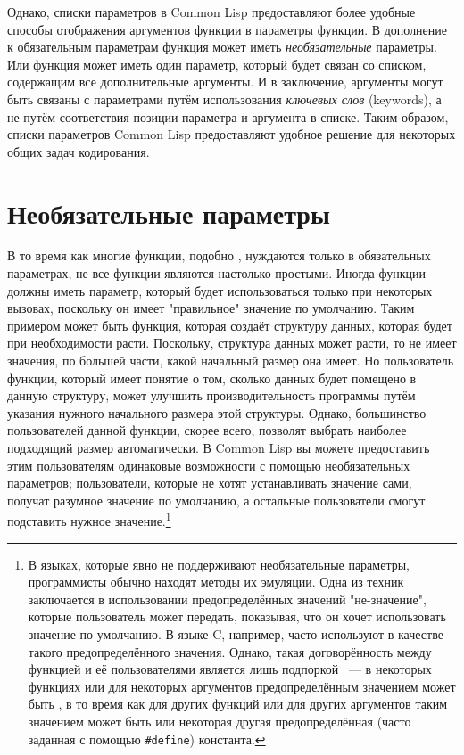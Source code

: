 Однако, списки параметров в Common Lisp предоставляют более удобные способы отображения
аргументов функции в параметры функции.  В дополнение к обязательным параметрам функция
может иметь \textit{необязательные} параметры.  Или функция может иметь один параметр,
который будет связан со списком, содержащим все дополнительные аргументы.  И в заключение,
аргументы могут быть связаны с параметрами путём использования \textit{ключевых слов}
(keywords), а не путём соответствия позиции параметра и аргумента в списке.  Таким
образом, списки параметров Common Lisp предоставляют удобное решение для некоторых общих
задач кодирования.

\section{Необязательные параметры}

В то время как многие функции, подобно , нуждаются только в обязательных
параметрах, не все функции являются настолько простыми.  Иногда функции должны иметь
параметр, который будет использоваться только при некоторых вызовах, поскольку он имеет
"правильное" значение по умолчанию.  Таким примером может быть функция, которая создаёт
структуру данных, которая будет при необходимости расти.  Поскольку, структура данных
может расти, то не имеет значения, по большей части, какой начальный размер она имеет.  Но
пользователь функции, который имеет понятие о том, сколько данных будет помещено в данную
структуру, может улучшить производительность программы путём указания нужного начального
размера этой структуры.  Однако, большинство пользователей данной функции, скорее всего,
позволят выбрать наиболее подходящий размер автоматически.  В Common Lisp вы можете
предоставить этим пользователям одинаковые возможности с помощью необязательных
параметров; пользователи, которые не хотят устанавливать значение сами, получат разумное
значение по умолчанию, а остальные пользователи смогут подставить нужное
значение.\footnote{В языках, которые явно не поддерживают необязательные параметры,
  программисты обычно находят методы их эмуляции.  Одна из техник заключается в
  использовании предопределённых значений "не-значение", которые пользователь может
  передать, показывая, что он хочет использовать значение по умолчанию.  В языке C,
  например, часто используют  в качестве такого предопределённого значения.
  Однако, такая договорённость между функцией и её пользователями является лишь подпоркой
  ~--- в некоторых функциях или для некоторых аргументов предопределённым значением может
  быть , в то время как для других функций или для других аргументов таким
  значением может быть  или некоторая другая предопределённая (часто заданная с
  помощью \lstinline!#define!) константа.}

